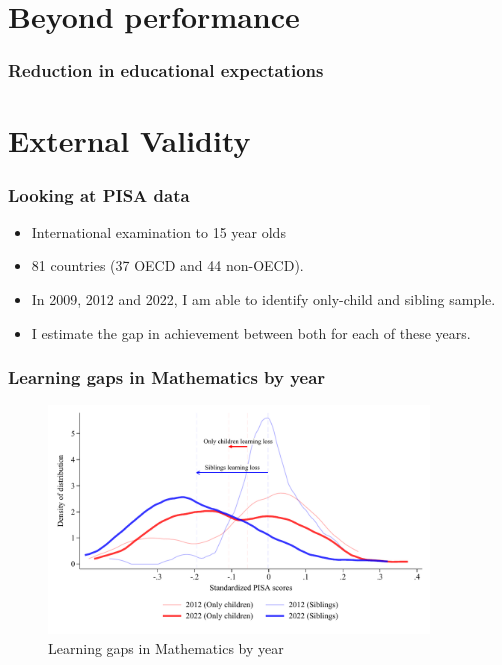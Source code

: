 \documentclass{beamer}
\begin{document}
\section{Beyond performance}

    \begin{frame}
            \label{frame:expectations}
            \frametitle{Reduction in educational expectations}
    
    \end{frame}

\section{External Validity}

    \begin{frame}
            \label{frame:pisadata}
            \frametitle{Looking at PISA data}
        \begin{itemize}
            \item International examination to 15 year olds
            \item 81 countries (37 OECD and 44 non-OECD).
            \item In 2009, 2012 and 2022, I am able to identify only-child and sibling sample.
            \item I estimate the gap in achievement between both for each of these years.
        \end{itemize}
    \end{frame}

\begin{frame}
    \label{frame:pisagaps}
    \frametitle{Learning gaps in Mathematics by year}
    
    \begin{figure}
        \centering
        \includegraphics[width=0.9\textwidth]{./FIGURES/Descriptive/PISA_distribution_2012_2022_PV4MATH.pdf}
        \caption{Learning gaps in Mathematics by year}
        \label{fig:1a}
    \end{figure}
    
\end{frame}
\end{document}
